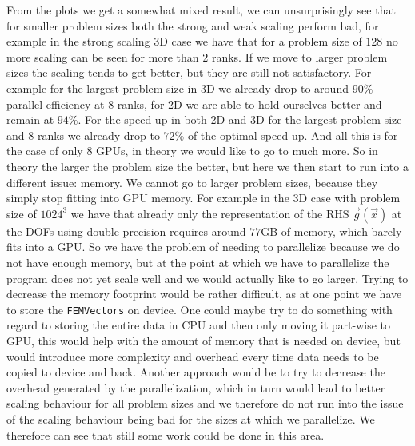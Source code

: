 From the plots we get a somewhat mixed result, we can unsurprisingly see that for smaller problem sizes both the strong and weak scaling perform bad, for example in the strong scaling 3D case we have that for a problem size of \(128\) no more scaling can be seen for more than 2 ranks. If we move to larger problem sizes the scaling tends to get better, but they are still not satisfactory. For example for the largest problem size in 3D we already drop to around \(90\%\) parallel efficiency at \(8\) ranks, for 2D we are able to hold ourselves better and remain at \(94\%\). For the speed-up in both 2D and 3D for the largest problem size and \(8\) ranks we already drop to \(72\%\) of the optimal speed-up. And all this is for the case of only \(8\) GPUs, in theory we would like to go to much more. So in theory the larger the problem size the better, but here we then start to run into a different issue: memory. We cannot go to larger problem sizes, because they simply stop fitting into GPU memory. For example in the 3D case with problem size of \(1024^3\) we have that already only the representation of the RHS \(\vec g(\vec x)\) at the DOFs using double precision requires around \(77\)GB of memory, which barely fits into a GPU. So we have the problem of needing to parallelize because we do not have enough memory, but at the point at which we have to parallelize the program does not yet scale well and we would actually like to go larger. Trying to decrease the memory footprint would be rather difficult, as at one point we have to store the \texttt{FEMVectors} on device. One could maybe try to do something with regard to storing the entire data in CPU and then only moving it part-wise to GPU, this would help with the amount of memory that is needed on device, but would introduce more complexity and overhead every time data needs to be copied to device and back. Another approach would be to try to decrease the overhead generated by the parallelization, which in turn would lead to better scaling behaviour for all problem sizes and we therefore do not run into the issue of the scaling behaviour being bad for the sizes at which we parallelize. We therefore can see that still some work could be done in this area.